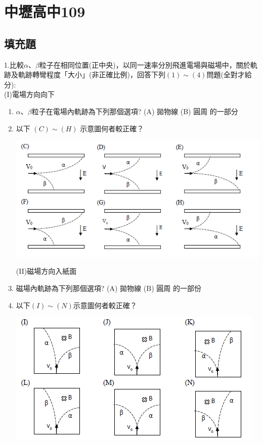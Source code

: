 \documentclass[cn,10pt,math=newtx,chinesefont=founder,device=ig]{elegantbook}
\begin{document}
\newpage


\chapter{中壢高中109}
\section{填充題}


\begin{example}
   1.比較$\alpha、\beta$粒子在相同位置(正中央)，以同一速率分別飛進電場與磁場中，關於軌跡及軌跡轉彎程度「大小」(非正確比例)，回答下列$(1)\sim(4)$問題(全對才給分):\\
(I)電場方向向下
   \begin{enumerate}[label=(\arabic*)] 
  \item $\alpha、\beta$粒子在電場內軌跡為下列那個選項? (A) 拋物線 (B) 圓周  的一部分
  \item 以下 $(C)\sim(H)$ 示意圖何者較正確？
    \begin{center}
\includegraphics[scale=1.2]{image/109中壢1-1.png}
\end{center}
(II)磁場方向入紙面
  \item 磁場內軌跡為下列那個選項? (A) 拋物線 (B) 圓周 的一部份
  \item 以下$(I)\sim (N)$示意圖何者較正確？
  \begin{center}
\includegraphics[scale=1.2]{image/109中壢1-2.png}
\end{center}

    \end{enumerate}

    \rightline{[中壢高中教甄109]}
\end{example}
\begin{solution}
    
\end{solution}
\end{document}

